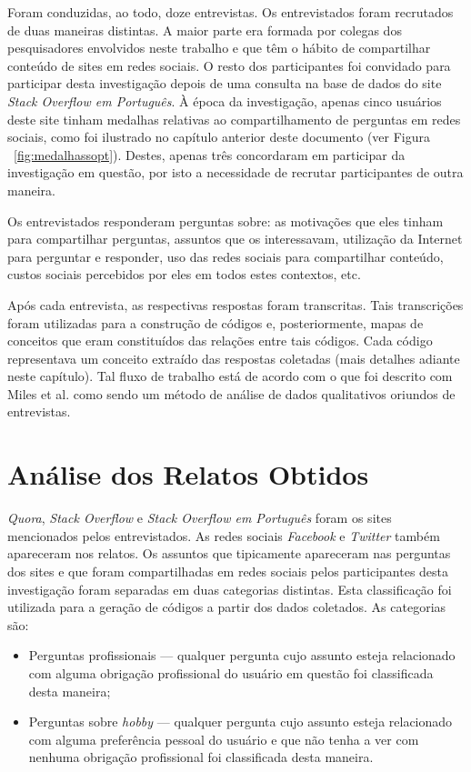 Foram conduzidas, ao todo, doze entrevistas. Os entrevistados foram recrutados de duas maneiras distintas. A maior parte era formada por colegas dos pesquisadores envolvidos neste trabalho e que têm o hábito de compartilhar conteúdo de sites \qa em redes sociais. O resto dos participantes foi convidado para participar desta investigação depois de uma consulta na base de dados do site \textit{Stack Overflow em Português}. À época da investigação, apenas cinco usuários deste site tinham medalhas relativas ao compartilhamento de perguntas em redes sociais, como foi ilustrado no capítulo anterior deste documento (ver Figura ~\ref{fig:medalhassopt}). Destes, apenas três concordaram em participar da investigação em questão, por isto a necessidade de recrutar participantes de outra maneira.

Os entrevistados responderam perguntas sobre: as motivações que eles tinham para compartilhar perguntas, assuntos que os interessavam, utilização da Internet para perguntar e responder, uso das redes sociais para compartilhar conteúdo, custos sociais percebidos por eles em todos estes contextos, etc.

Após cada entrevista, as respectivas respostas foram transcritas. Tais transcrições foram utilizadas para a construção de códigos e, posteriormente, mapas de conceitos que eram constituídos das relações entre tais códigos. Cada código representava um conceito extraído das respostas coletadas (mais detalhes adiante neste capítulo). Tal fluxo de trabalho está de acordo com o que foi descrito com Miles et al. \cite{miles2013qualitative} como sendo um método de análise de dados qualitativos oriundos de entrevistas. 

\section{Análise dos Relatos Obtidos}
\textit{Quora}, \textit{Stack Overflow} e \textit{Stack Overflow em Português} foram os sites mencionados pelos entrevistados. As redes sociais \textit{Facebook} e \textit{Twitter} também apareceram nos relatos. Os assuntos que tipicamente apareceram nas perguntas dos sites \qa e que foram compartilhadas em redes sociais pelos participantes desta investigação foram separadas em duas categorias distintas. Esta classificação foi utilizada para a geração de códigos a partir dos dados coletados. As categorias são:
\begin{itemize}
    \item Perguntas profissionais --- qualquer pergunta cujo assunto esteja relacionado com alguma obrigação profissional do usuário em questão foi classificada desta maneira;
    \item Perguntas sobre \textit{hobby} --- qualquer pergunta cujo assunto esteja relacionado com alguma preferência pessoal do usuário e que não tenha a ver com nenhuma obrigação profissional foi classificada desta maneira.
\end{itemize}

